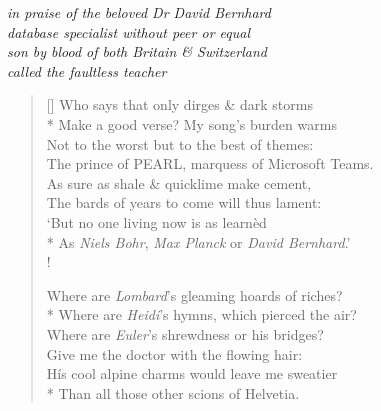 \begin{center}
\textit{in praise of the beloved Dr David Bernhard}\\
\textit{database specialist without peer or equal}\\
\textit{son by blood of both Britain \& Switzerland}\\
\textit{called the faultless teacher}
\end{center}

\bigskip

\settowidth{\versewidth}{His cool alpine charms would leave me sweatier}
\begin{verse}[\versewidth]
Who says that only dirges \& dark storms\\*
Make a good verse? My song's burden warms\\
Not to the worst but to the best of themes:\\
The prince of PEARL, marquess of Microsoft Teams.\\
As sure as shale \& quicklime make cement,\\
The bards of years to come will thus lament:\\
`But no one living now is  as learn\`ed\\*
As \textit{Niels Bohr}, \textit{Max Planck} or \textit{David Bernhard}.'\\!

Where are \textit{Lombard}'s gleaming hoards of riches?\\*
\vin Where are \textit{Heidi}'s hymns, which pierced the air?\\
Where are \textit{Euler}'s shrewdness or his bridges?\\
\vin Give me the doctor with the flowing hair:\\
H\'is cool alpine charms would leave me sweatier\\*
Than all those other scions of Helvetia.
\end{verse}
